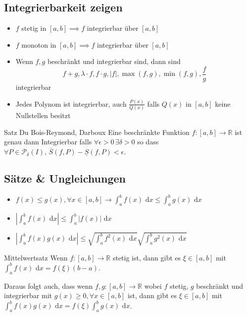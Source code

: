 \documentclass[a4paper,10pt]{article}
\def\R{\mathbb{R}}
\def\dx{\text{ d}x}
\begin{document}
\subsection{Integrierbarkeit zeigen}
\begin{itemize}
 \item $f$ stetig in $[a,b] \implies f$ integrierbar über $[a,b]$
 \item $f$ monoton in $[a,b] \implies f$ integrierbar über $[a,b]$
 \item Wenn $f,g$ beschränkt und integrierbar sind, dann sind
 $$f+g, \lambda \cdot f, f \cdot g, |f|, \max(f,g), \min(f,g), \frac{f}{g}$$ integrierbar
 \item Jedes Polynom ist integrierbar, auch $\frac{P(x)}{Q(x)}$ falls $Q(x)$ in $[a,b]$ keine Nullstellen besitzt
\end{itemize}

\begin{mainbox}{Satz Du Bois-Reymond, Darboux}
  Eine beschränkte Funktion $f: [a,b] \to \R$ ist genau dann Integrierbar falls $\forall \epsilon > 0 \, \exists \delta > 0$ so dass\\
  $\forall P \in \mathcal{P}_\delta(I), \, \overline{S}(f,P) - \underline{S}(f, P) < \epsilon$.
\end{mainbox}

\subsection{Sätze \& Ungleichungen}
\begin{itemize}
 \item $f(x) \le g(x), \forall x \in [a,b] \rightarrow \int_a^b f(x) \dx \le \int_a^b g(x) \dx$
 \item $\left|\int_a^b f(x) \dx\right| \le \int_a^b |f(x)| \dx$
 \item $\left|\int_a^b f(x) g(x) \dx \right| \le \sqrt{\int_a^b f^2(x) \dx} \sqrt{\int_a^b g^2(x) \dx}$
\end{itemize}

\begin{mainbox}{Mittelwertsatz}
 Wenn $f: [a,b] \to \R$ stetig ist, dann gibt es $\xi \in [a,b]$ mit $\int_a^b f(x) \dx = f(\xi) (b-a)$.
\end{mainbox}
Daraus folgt auch, dass wenn $f,g: [a,b] \to \R$ wobei $f$ stetig, $g$ beschränkt und integrierbar mit $g(x) \ge 0, \forall x \in [a,b]$ ist, dann gibt es $\xi \in [a,b]$ mit $\int_a^b f(x)g(x) \dx = f(\xi) \int_a^b g(x) \dx$.
\end{document}
